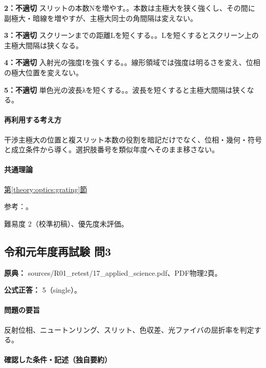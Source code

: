 \noindent\textbf{2：不適切} スリットの本数Nを増やす。。本数は主極大を狭く強くし、その間に副極大・暗線を増やすが、主極大同士の角間隔は変えない。\par

\noindent\textbf{3：不適切} スクリーンまでの距離Lを短くする。。Lを短くするとスクリーン上の主極大間隔は狭くなる。\par

\noindent\textbf{4：不適切} 入射光の強度Iを強くする。。線形領域では強度は明るさを変え、位相の極大位置を変えない。\par

\noindent\textbf{5：不適切} 単色光の波長λを短くする。。波長を短くすると主極大間隔は狭くなる。\par

\paragraph{再利用する考え方} 干渉主極大の位置と複スリット本数の役割を暗記だけでなく、位相・幾何・符号と成立条件から導く。選択肢番号を類似年度へそのまま移さない。

\paragraph{共通理論} \hyperref[theory:optics:grating]{第\ref*{theory:optics:grating}節}

\par 参考：\cite{os_grating,os_double}。

\par 難易度 2（校準初稿）、優先度未評価。

\subsection{令和元年度再試験 問3}
\label{q:r01-ret-applied-03}

\noindent\textbf{原典：} sources/R01\_retest/17\_applied\_science.pdf、PDF物理2頁。

\textbf{公式正答：} 5（single）。

\paragraph{問題の要旨} 反射位相、ニュートンリング、スリット、色収差、光ファイバの屈折率を判定する。

\paragraph{確認した条件・記述（独自要約）}\mbox{}\par

